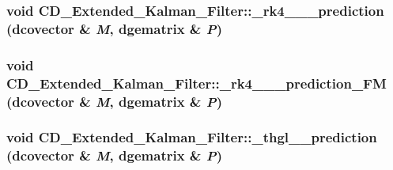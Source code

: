 \hypertarget{class_c_d___extended___kalman___filter_79f174e2ff2bb51ada2d1cee3240fbb1}{
\subsubsection[{\_\-rk4\_\-\_\-\_\-prediction}]{\setlength{\rightskip}{0pt plus 5cm}void CD\_\-Extended\_\-Kalman\_\-Filter::\_\-rk4\_\-\_\-\_\-prediction (dcovector \& {\em M}, \/  dgematrix \& {\em P})}}
\label{class_c_d___extended___kalman___filter_79f174e2ff2bb51ada2d1cee3240fbb1}


\hypertarget{class_c_d___extended___kalman___filter_aff3514a20d714c817780fa1871f4a9d}{
\subsubsection[{\_\-rk4\_\-\_\-\_\-prediction\_\-FM}]{\setlength{\rightskip}{0pt plus 5cm}void CD\_\-Extended\_\-Kalman\_\-Filter::\_\-rk4\_\-\_\-\_\-prediction\_\-FM (dcovector \& {\em M}, \/  dgematrix \& {\em P})}}
\label{class_c_d___extended___kalman___filter_aff3514a20d714c817780fa1871f4a9d}


\hypertarget{class_c_d___extended___kalman___filter_e11771d2cea027b53e17091e817e59bd}{
\subsubsection[{\_\-thgl\_\-\_\-prediction}]{\setlength{\rightskip}{0pt plus 5cm}void CD\_\-Extended\_\-Kalman\_\-Filter::\_\-thgl\_\-\_\-prediction (dcovector \& {\em M}, \/  dgematrix \& {\em P})}}
\label{class_c_d___extended___kalman___filter_e11771d2cea027b53e17091e817e59bd}


